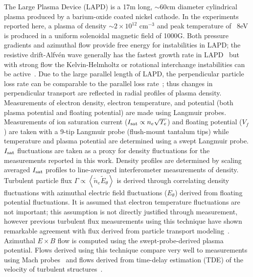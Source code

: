 \documentclass[aps,prl,amsmath,amssymb,preprint,superscriptaddress]{revtex4} %
\begin{document}
The Large Plasma Device \cite{gek91} (LAPD) is a 17m long, $\sim$60cm diameter cylindrical plasma produced by a barium-oxide coated nickel
cathode. In the experiments reported here, a plasma of density $\sim$$2 \times 10^{12}$ cm$^{-3}$ and peak temperature of ~8eV is
produced in a uniform solenoidal magnetic field of 1000G.  Both pressure gradients and azimuthal flow provide free energy for instabilities in LAPD; the resistive drift-Alfv\'{e}n wave generally has the fastest growth rate in LAPD~\cite{maggsmor03,popovich10} but with strong flow the Kelvin-Helmholtz or rotational interchange instabilities can be active~\cite{horton05,popovich10}.  Due to the large parallel length of LAPD, the perpendicular particle loss rate can be comparable to the parallel loss rate~\cite{maggs07}; thus changes in perpendicular transport are reflected in radial profiles of plasma density.
 Measurements of electron density, electron temperature, and potential (both plasma
potential and floating potential) are made using Langmuir probes.  
Measurements of ion saturation current ($I_{\rm sat} \propto n_e \sqrt{T_e}$) and floating
potential ($V_f$) are taken with a 9-tip Langmuir probe (flush-mount
tantalum tips) while temperature and plasma potential are
determined using a swept Langmuir probe. $I_{\rm sat}$ fluctuations are taken as a proxy for density fluctuations for the measurements reported in this work. Density profiles are determined by scaling averaged $I_{\rm sat}$ profiles to line-averaged interferometer measurements of density.  Turbulent particle flux
$\Gamma \propto \left<\tilde{n}_e \tilde{E}_\theta\right>$ is
derived through correlating density fluctuations
with azimuthal electric field fluctuations ($E_\theta$) derived from
floating potential fluctuations.  It is assumed that electron temperature fluctuations are not important; this assumption is not directly justified through measurement, however previous turbulent flux measurements using this technique have shown remarkable agreement with flux derived from particle transport modeling~\cite{carter09}.  Azimuthal $E\times B$ flow is computed
using the swept-probe-derived plasma potential.  Flows derived using
this technique compare very well to measurements using
Mach probes~\cite{maggs07} and flows derived from time-delay
estimation (TDE) of the velocity of turbulent structures~\cite{holland04}.
  
\end{document}
